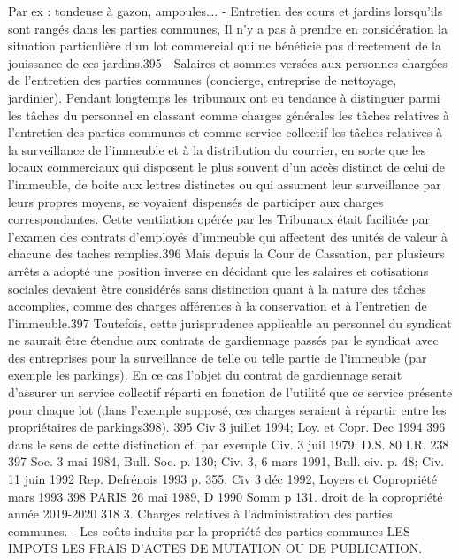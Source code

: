 		Par ex : tondeuse à gazon, ampoules….
		- Entretien des cours et jardins lorsqu'ils sont rangés dans les parties communes,
		Il n’y a pas à prendre en considération la situation particulière d'un lot commercial qui ne bénéficie pas directement de la jouissance de ces jardins.395
		- Salaires et sommes versées aux personnes chargées de l'entretien des parties communes (concierge, entreprise de nettoyage, jardinier).
		Pendant longtemps les tribunaux ont eu tendance à distinguer parmi les tâches du personnel en classant comme charges générales les tâches relatives à l'entretien des parties communes et comme service collectif les tâches relatives à la surveillance de l'immeuble et à la distribution du courrier, en sorte que les locaux commerciaux qui disposent le plus souvent d'un accès distinct de celui de l'immeuble, de boite aux lettres distinctes ou qui assument leur surveillance par leurs propres moyens, se voyaient dispensés de participer aux charges correspondantes. Cette ventilation opérée par les Tribunaux était facilitée par l'examen des contrats d'employés d'immeuble qui affectent des unités de valeur à chacune des taches remplies.396
		Mais depuis la Cour de Cassation, par plusieurs arrêts a adopté une position inverse en décidant que les salaires et cotisations sociales devaient être considérés sans distinction quant à la nature des tâches accomplies, comme des charges afférentes à la conservation et à l'entretien de l'immeuble.397
		Toutefois, cette jurisprudence applicable au personnel du syndicat ne saurait être étendue aux contrats de gardiennage passés par le syndicat avec des entreprises pour la surveillance de telle ou telle partie de l’immeuble (par exemple les parkings). En ce cas l'objet du contrat de gardiennage serait d'assurer un service collectif réparti en fonction de l'utilité que ce service présente pour chaque lot (dans l’exemple supposé, ces charges seraient à répartir entre les propriétaires de parkings398).
		395 Civ 3 juillet 1994; Loy. et Copr. Dec 1994 
		396 dans le sens de cette distinction cf. par exemple Civ. 3 juil 1979; D.S. 80 I.R. 238
		397 Soc. 3 mai 1984, Bull. Soc.  p. 130; Civ. 3\degres, 6 mars 1991, Bull. civ.  p. 48; Civ. 11 juin 1992 Rep. Defrénois 1993 p. 355; Civ 3 déc 1992, Loyers et Copropriété mars 1993 
		398 PARIS 26 mai 1989, D 1990 Somm p 131.
		droit de la copropriété année 2019-2020
		318
		3. Charges relatives à l'administration des parties communes.
		- Les coûts induits par la propriété des parties communes
		LES IMPOTS
		LES FRAIS D'ACTES DE MUTATION OU DE PUBLICATION.
